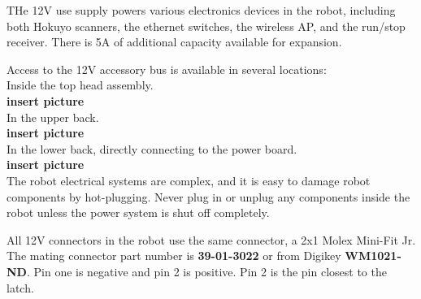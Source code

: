 THe 12V use supply powers various electronics devices in the robot, including both Hokuyo scanners, the ethernet switches, the wireless
AP, and the run/stop receiver.  There is 5A of
additional capacity available for expansion.

Access to the 12V accessory bus is available in several locations:\\

Inside the top head assembly.\\

{\bf insert picture}\\


In the upper back.\\

{\bf insert picture}\\


In the lower back, directly connecting to the power board.\\

{\bf insert picture}\\

The robot electrical systems are complex, and it is easy to damage robot components
by hot-plugging.  Never plug in or unplug any components inside the robot unless
the power system is shut off completely.

All 12V connectors in the robot use the same connector, a 2x1 Molex Mini-Fit
Jr. The mating connector part number is {\bf 39-01-3022} or from Digikey {\bf
  WM1021-ND}. Pin one is negative and pin 2 is positive. Pin 2 is the pin
closest to the latch.


